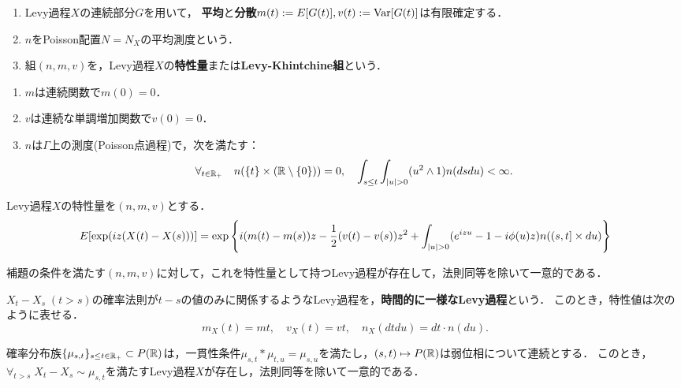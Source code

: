 \documentclass[uplatex,dvipdfmx]{jsreport}
\begin{document}
\begin{definition}\mbox{}
    \begin{enumerate}
        \item Levy過程$X$の連続部分$G$を用いて，
        \textbf{平均}と\textbf{分散}$m(t):=E[G(t)],v(t):=\mathrm{Var}[G(t)]$は有限確定する．
        \item $n$をPoisson配置$N=N_X$の平均測度という．
        \item 組$(n,m,v)$を，Levy過程$X$の\textbf{特性量}または\textbf{Levy-Khintchine組}という．
    \end{enumerate}
\end{definition}

\begin{lemma}\mbox{}
    \begin{enumerate}
        \item $m$は連続関数で$m(0)=0$．
        \item $v$は連続な単調増加関数で$v(0)=0$．
        \item $n$は$\Gamma$上の測度(Poisson点過程)で，次を満たす：
        \[\forall_{t\in\mathbb{R}_+}\quad n(\{t\}\times(\mathbb{R}\setminus\{0\}))=0,\quad\int_{s\le t}\int_{\lvert u\rvert>0}(u^2\land 1)n(dsdu)<\infty.\]
    \end{enumerate}
\end{lemma}


\begin{theorem}
    Levy過程$X$の特性量を$(n,m,v)$とする．
    \[E[\exp(iz(X(t)-X(s)))]=\exp\left\{i(m(t)-m(s))z-\frac{1}{2}(v(t)-v(s))z^2+\int_{\lvert u\rvert>0}(e^{izu}-1-i\phi(u)z)n((s,t]\times du)\right\}\]
\end{theorem}

\begin{theorem}
    補題の条件を満たす$(n,m,v)$に対して，これを特性量として持つLevy過程が存在して，法則同等を除いて一意的である．
\end{theorem}

\begin{corollary}[時間的に一様な場合]
    $X_t-X_s\;(t>s)$の確率法則が$t-s$の値のみに関係するようなLevy過程を，\textbf{時間的に一様なLevy過程}という．
    このとき，特性値は次のように表せる．
    \[m_X(t)=mt,\quad v_X(t)=vt,\quad n_X(dtdu)=dt\cdot n(du).\]
\end{corollary}

\begin{corollary}[構成定理]\label{cor-construction-of-Levy-process}
    確率分布族$\{\mu_{s,t}\}_{s\le t\in\mathbb{R}_+}\subset P(\mathbb{R})$は，一貫性条件$\mu_{s,t}*\mu_{t,u}=\mu_{s,u}$を満たし，$(s,t)\mapsto P(\mathbb{R})$は弱位相について連続とする．
    このとき，$\forall_{t>s}\;X_t-X_s\sim\mu_{s,t}$を満たすLevy過程$X$が存在し，法則同等を除いて一意的である．
\end{corollary}
\end{document}
